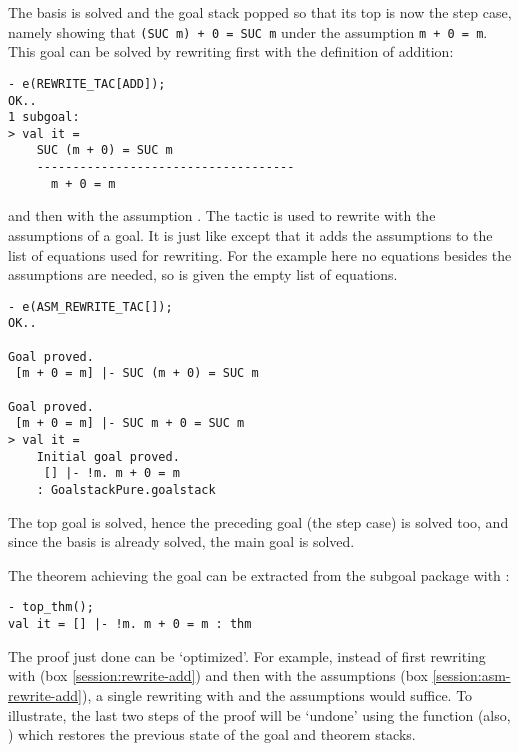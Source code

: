 \noindent The basis is solved and the goal
stack popped so that its top is now the step case, namely showing that
{\small\verb|(SUC m) + 0 = SUC m|} under the assumption
{\small\verb|m + 0 = m|}. This goal can be solved by rewriting first with the
definition of addition:

\begin{session}\begin{verbatim}
- e(REWRITE_TAC[ADD]);
OK..
1 subgoal:
> val it =
    SUC (m + 0) = SUC m
    ------------------------------------
      m + 0 = m
\end{verbatim}\label{session:rewrite-add}\end{session}

\noindent and then with the assumption . The tactic
 is used to rewrite with the assumptions of a
goal. It is just like  except that it adds the
assumptions to the list of equations used for rewriting. For the
example here no equations besides the assumptions are needed, so
 is given the empty list of equations.

\begin{session}\begin{verbatim}
- e(ASM_REWRITE_TAC[]);
OK..

Goal proved.
 [m + 0 = m] |- SUC (m + 0) = SUC m

Goal proved.
 [m + 0 = m] |- SUC m + 0 = SUC m
> val it =
    Initial goal proved.
     [] |- !m. m + 0 = m
    : GoalstackPure.goalstack
\end{verbatim}\label{session:asm-rewrite-add}\end{session}

\noindent The top goal is solved, hence the preceding goal (the step case)
is solved too, and since the basis is already solved, the main goal is
solved.

The theorem achieving the goal can be extracted from the subgoal package with
:

\begin{session}\begin{verbatim}
- top_thm();
val it = [] |- !m. m + 0 = m : thm
\end{verbatim}\end{session}

    The proof just done can be `optimized'. For example, instead of
    first rewriting with  (box \ref{session:rewrite-add}) and
    then with the assumptions (box \ref{session:asm-rewrite-add}), a
    single rewriting with  and the assumptions would suffice.
    To illustrate, the last two steps of the proof will be `undone'
    using the function  (also, ) which restores the
    previous state of the goal and theorem stacks.

